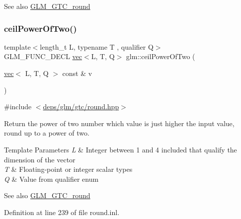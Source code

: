 \begin{DoxySeeAlso}{See also}
\hyperlink{group__gtc__round}{G\+L\+M\+\_\+\+G\+T\+C\+\_\+round} 
\end{DoxySeeAlso}
\mbox{\label{group__gtc__round_gab53d4a97c0d3e297be5f693cdfdfe5d2}} 
\subsubsection{\texorpdfstring{ceil\+Power\+Of\+Two()}{ceilPowerOfTwo()}\hspace{0.1cm}{\footnotesize\ttfamily [2/2]}}
{\footnotesize\ttfamily template$<$length\+\_\+t L, typename T , qualifier Q$>$ \\
G\+L\+M\+\_\+\+F\+U\+N\+C\+\_\+\+D\+E\+CL \hyperlink{structglm_1_1vec}{vec}$<$L, T, Q$>$ glm\+::ceil\+Power\+Of\+Two (\begin{DoxyParamCaption}\item[{\hyperlink{structglm_1_1vec}{vec}$<$ L, T, Q $>$ const \&}]{v }\end{DoxyParamCaption})}



{\ttfamily \#include $<$\hyperlink{round_8hpp}{deps/glm/gtc/round.\+hpp}$>$}

Return the power of two number which value is just higher the input value, round up to a power of two.


\begin{DoxyTemplParams}{Template Parameters}
{\em L} & Integer between 1 and 4 included that qualify the dimension of the vector \\
\hline
{\em T} & Floating-\/point or integer scalar types \\
\hline
{\em Q} & Value from qualifier enum\\
\hline
\end{DoxyTemplParams}
\begin{DoxySeeAlso}{See also}
\hyperlink{group__gtc__round}{G\+L\+M\+\_\+\+G\+T\+C\+\_\+round} 
\end{DoxySeeAlso}


Definition at line 239 of file round.\+inl.

\mbox{\label{group__gtc__round_ga2ffa3cd5f2ea746ee1bf57c46da6315e}} 
